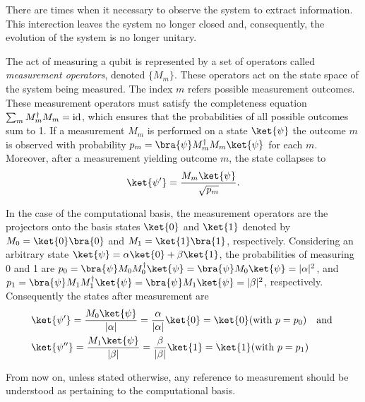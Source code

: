 
There are times when it necessary to observe the system to extract information. This interection leaves the system no longer closed and, consequently, the evolution of the system is no longer unitary. 

\begin{definition}
The act of measuring a qubit is represented by a set of operators called \emph{measurement operators}, denoted $\{M_{m}\}$. These operators act on the state space  of the system being measured. The index $m$ refers possible measurement outcomes. These measurement operators must satisfy the completeness equation $\sum_{m} M_{m}^{\dagger}M_{m} = \mathrm{id}$, which ensures that the probabilities of all possible outcomes sum to 1. If a measurement ${M_m}$ is performed on a state $\ket{\psi}$ the outcome $m$ is observed with probability $p_m = \bra{\psi}M_{m}^{\dagger}M_{m}\ket{\psi}$ for each $m$. Moreover, after a measurement yielding outcome $m$, the state collapses to 
\begin{align*}
  \ket{\psi'}=\frac{M_{m}\ket{\psi}}{\sqrt{p_{m}}}.
\end{align*}
\end{definition}

\begin{example}
In the case of the computational basis, the measurement operators are the projectors onto the basis states $\ket{0}$ and $\ket{1}$ denoted by $M_{0} = \ket{0}\bra{0}$ and $M_{1} = \ket{1}\bra{1}$, respectively. Considering an arbitrary state $\ket{\psi} = \alpha \ket{0} + \beta \ket{1}$, the probabilities of measuring 0 and 1 are $p_0 = \bra{\psi} M_{0} M_{0}^{\dag}\ket{\psi}=\bra{\psi} M_{0} \ket{\psi} = |\alpha|^{2}$, and $p_1 = \bra{\psi} M_{1} M_{1}^{\dag}\ket{\psi} = \bra{\psi} M_{1} \ket{\psi} =  |\beta|^{2} $, respectively. Consequently the states after measurement are
\begin{align*}
  &\ket{\psi'}=\frac{M_{0}\ket{\psi}} {|\alpha|} = \frac{\alpha}{|\alpha|} \ket{0} = \ket{0} (\text{with  } p=p_0) \quad \text{and } \\
  &\ket{\psi''}= \frac{M_{1}\ket{\psi}} {|\beta|} = \frac{\beta}{|\beta|} \ket{1} = \ket{1} (\text{with  } p=p_1)
\end{align*}
\end{example}


From now on, unless stated otherwise, any reference to measurement should be understood as pertaining to the computational basis.


